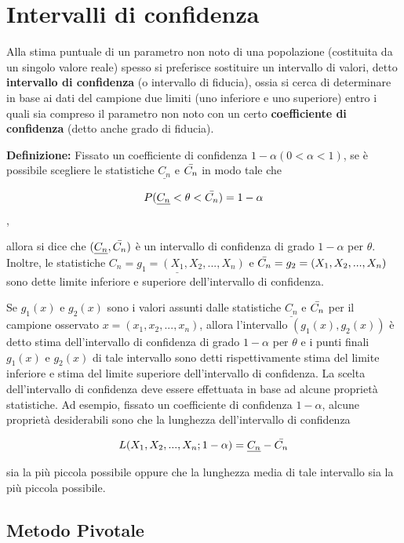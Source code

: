 \section{Intervalli di confidenza}

Alla stima puntuale di un parametro non noto di una popolazione (costituita da un singolo valore reale) spesso si preferisce sostituire un intervallo di valori, detto \textbf{intervallo di confidenza} (o intervallo di fiducia), ossia si cerca di determinare in base ai dati del campione due limiti (uno inferiore e uno superiore) entro i quali sia compreso il parametro non noto con un certo \textbf{coefficiente di confidenza} (detto anche grado di fiducia).

\noindent \textbf{Definizione:} Fissato un coefficiente di confidenza $1-\alpha (0 < \alpha < 1)$, se è possibile scegliere le statistiche $\underline{C_n}$ e $\Bar{C_n}$ in modo tale che

\[P(\underline{C_n} < \theta < \Bar{C_n}) = 1 - \alpha\],

allora si dice che $(\underline{C_n}, \Bar{C_n})$ è un intervallo di confidenza di grado $1 - \alpha$ per $\theta$. Inoltre, le statistiche $\underline{C_n = g_1 = (X_1, X_2, ..., X_n)}$ e $\Bar{C_n} = g_2 = (X_1, X_2, ..., X_n)$ sono dette limite inferiore e superiore dell'intervallo di confidenza.

Se $g_1(x)$ e $g_2(x)$ sono i valori assunti dalle statistiche $\underline{C_n}$ e $\Bar{C_n}$ per il campione osservato $x = (x_1, x_2, ..., x_n)$, allora l'intervallo $(g_1(x), g_2(x))$ è detto stima dell'intervallo di confidenza di grado $1-\alpha$ per $\theta$ e i punti finali $g_1(x)$ e $g_2(x)$ di tale intervallo sono detti rispettivamente stima del limite inferiore e stima del limite superiore dell'intervallo di confidenza. La scelta dell'intervallo di confidenza deve essere effettuata in base ad alcune proprietà statistiche. Ad esempio, fissato un coefficiente di confidenza $1-\alpha$, alcune proprietà desiderabili sono che la lunghezza dell'intervallo di confidenza 

\[L(X_1, X_2, ..., X_n;1-\alpha) = \underline{C_n} - \Bar{C_n}\]

sia la più piccola possibile oppure che la lunghezza media di tale intervallo sia la più piccola possibile.

\subsection{Metodo Pivotale}

